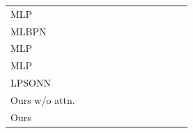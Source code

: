 \documentclass{ieeeaccess}
\begin{document}
\begin{table}[t]
\begin{tabular}{llllllllllll}
		MLP\cite{rahman2009localization}   &                       &                       &                       &                           &                       &                       &                       &                           &                                           &                                                 &                                                 \\
		MLBPN\cite{singh2013tdoa}          &                       &                       &                       &                           &                       &                       &                       &                           &                                           &                                                 &                                                 \\
		MLP\cite{abdelhadi2013efficient}   &                       &                       &                       &                           &                       &                       &                       &                           &                                           &                                                 &                                                 \\
		MLP\cite{kumar2016localization}    &                       &                       &                       &                           &                       &                       &                       &                           &                                           &                                                 &                                                 \\
		LPSONN\cite{banihashemian2018new}  &                       &                       &                       &                           &                       &                       &                       &                           &                                           &                                                 &                                                 \\
		Ours w/o attn.          &                       &                       &                       &                           &                       &                       &                       &                           &                                           &                                                 &                                                 \\
		Ours                    &                       &                       &                       &                           &                       &                       &                       &                           &                                           &                                                 &                                                 \\

\end{tabular}
\end{table}
\end{document}

